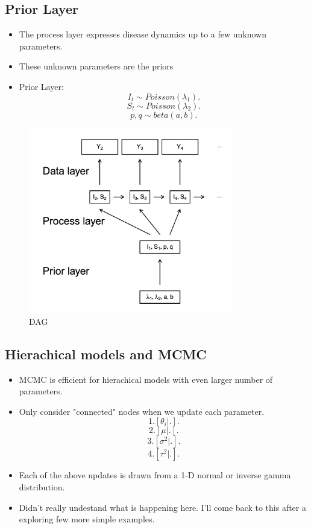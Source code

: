 \documentclass{article}
\begin{document}
\begin{itemize}
        \subsection{Prior Layer}
        \begin{itemize}
            \item The process layer expresses disease dynamics up to a few unknown parameters.
            \item These unknown parameters are the priors
            \item Prior Layer:
                \[
                    I_{t} \sim  Poisson(\lambda_{1})
                .\] 
                \[
                    S_{t} \sim Poisson(\lambda_{2})
                .\] 
                \[
                    p, q \sim beta(a,b) 
                .\] 
        \end{itemize}
        \begin{figure}[H]
            \centering
            \includegraphics[width=0.8\textwidth]{dag}
            \caption{DAG}
            \label{fig:dag}
        \end{figure}
        \subsection{Hierachical models and MCMC}
        \begin{itemize}
            \item MCMC is efficient for hierachical models with even larger number of parameters.
            \item Only consider "connected" nodes when we update each parameter.
            \[
                1. [\theta_{i}|.]
            .\]
            \[
                2. [\mu|.]
            .\] 
            \[
                3. [\sigma^2|.]
            .\] 
            \[
                4. [\tau^2|.]
            .\] 
            \item Each of the above updates is drawn from a 1-D normal or inverse gamma distribution. 
            \item Didn't really undestand what is happening here. I'll come back to this after a exploring few more simple examples.
        \end{itemize}
\end{itemize}
\end{document}

